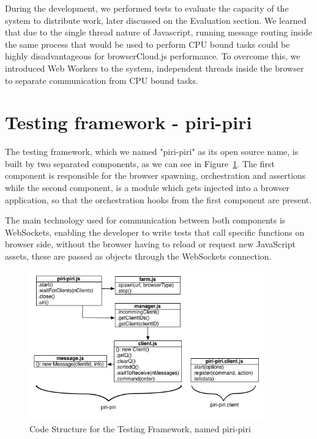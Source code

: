 During the development, we performed tests to evaluate the capacity of the system to distribute work, later discussed on the Evaluation section. We learned that due to the single thread nature of Javascript, running message routing inside the same process that would be used to perform CPU bound tasks could be highly disadvantageous for browserCloud.js performance. To overcome this, we introduced Web Workers to the system, independent threads inside the browser to separate communication from CPU bound tasks.

\section{Testing framework - piri-piri}

The testing framework, which we named "piri-piri" as its open source name, is built by two separated components, as we can see in Figure~\ref{fig:d-p-p}. The first component is responsible for the browser spawning, orchestration and assertions while the second component, is a module which gets injected into a browser application, so that the orchestration hooks from the first component are present.

The main technology used for communication between both components is WebSockets, enabling the developer to write tests that call specific functions on browser side, without the browser having to reload or request new JavaScript assets, these are passed as objects through the WebSockets connection.

\begin{figure}[h!]
  \centering
  \includegraphics[width=0.9\textwidth]{figs/diagram-piri-piri}
  \caption{Code Structure for the Testing Framework, named piri-piri}
  \label{fig:d-p-p}
\end{figure}


